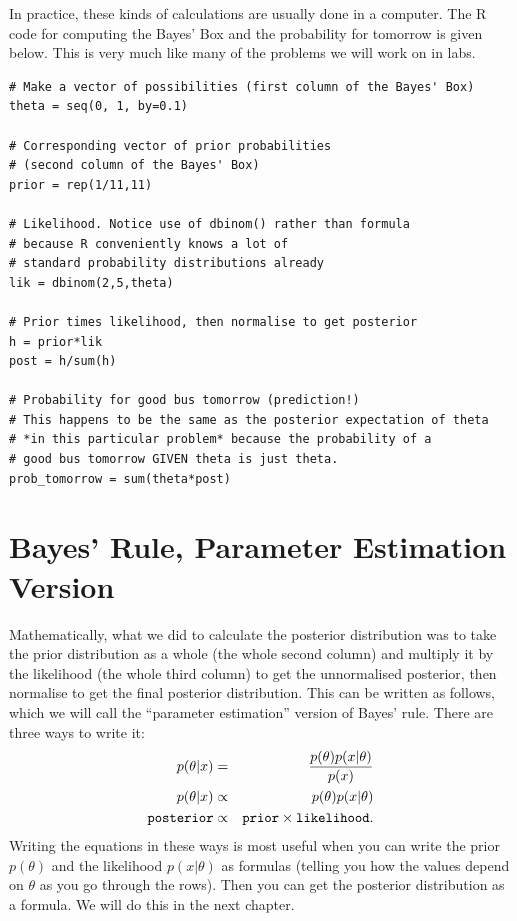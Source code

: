 In practice, these kinds of calculations are usually done in a computer.
The R code for computing the Bayes' Box and the probability for tomorrow
is given below. This is very much like many of the problems we will work on in
labs.

\begin{framed}
\begin{verbatim}
# Make a vector of possibilities (first column of the Bayes' Box)
theta = seq(0, 1, by=0.1)

# Corresponding vector of prior probabilities
# (second column of the Bayes' Box)
prior = rep(1/11,11)

# Likelihood. Notice use of dbinom() rather than formula
# because R conveniently knows a lot of
# standard probability distributions already
lik = dbinom(2,5,theta)

# Prior times likelihood, then normalise to get posterior
h = prior*lik
post = h/sum(h)

# Probability for good bus tomorrow (prediction!)
# This happens to be the same as the posterior expectation of theta
# *in this particular problem* because the probability of a
# good bus tomorrow GIVEN theta is just theta.
prob_tomorrow = sum(theta*post)
\end{verbatim}
\end{framed}

\section{Bayes' Rule, Parameter Estimation Version}
Mathematically, what we did to calculate the posterior distribution was to
take the prior distribution as a whole (the whole second column) and multiply it
by the likelihood (the whole third column) to get the
unnormalised posterior, then normalise to get the final posterior distribution.
This can be written as follows, which we will call the ``parameter estimation''
version of Bayes' rule. There are three ways to write it:
\begin{eqnarray}
p(\theta | x) &=& \frac{p(\theta)p(x|\theta)}{p(x)}\\
p(\theta | x) &\propto& p(\theta)p(x|\theta)\\
{\tt posterior} &\propto& {\tt prior}\times{\tt likelihood}.
\end{eqnarray}
Writing the equations in these ways is most useful when you can write the
prior $p(\theta)$ and the likelihood $p(x|\theta)$ as formulas (telling you
how the values depend on $\theta$ as you go through the rows). Then you can get the
posterior distribution as a formula. We will do this in the next chapter.


